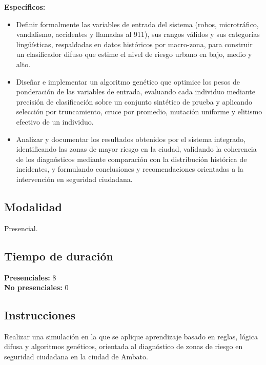\documentclass[11pt]{article}
\begin{document}
\textbf{Específicos:}\\
\begin{itemize}
    \item Definir formalmente las variables de entrada del sistema (robos, microtráfico, vandalismo, accidentes y llamadas al 911), sus rangos válidos y sus categorías lingüísticas, respaldadas en datos históricos por macro-zona, para construir un clasificador difuso que estime el nivel de riesgo urbano en bajo, medio y alto.
    \item Diseñar e implementar un algoritmo genético que optimice los pesos de ponderación de las variables de entrada, evaluando cada individuo mediante precisión de clasificación sobre un conjunto sintético de prueba y aplicando selección por truncamiento, cruce por promedio, mutación uniforme y elitismo efectivo de un individuo.
    \item Analizar y documentar los resultados obtenidos por el sistema integrado, identificando las zonas de mayor riesgo en la ciudad, validando la coherencia de los diagnósticos mediante comparación con la distribución histórica de incidentes, y formulando conclusiones y recomendaciones orientadas a la intervención en seguridad ciudadana.
\end{itemize}


\subsection{Modalidad}
\begin{tabbing}
    \hspace{1cm} \= Presencial.\\
\end{tabbing}

\subsection{Tiempo de duración}
\begin{tabbing}
    \hspace{1cm} \= \textbf{Presenciales:} \= 8 \\ 
    \hspace{1cm} \= \textbf{No presenciales:} \= 0
\end{tabbing}


\subsection{Instrucciones}

Realizar una simulación en la que se aplique aprendizaje basado en reglas, lógica difusa y algoritmos genéticos, orientada al diagnóstico de zonas de riesgo en seguridad ciudadana en la ciudad de Ambato.
\end{document}
